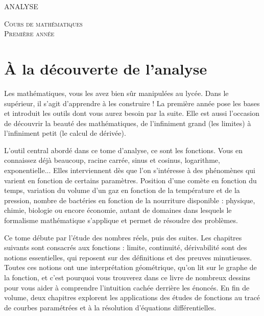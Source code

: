 
\pagestyle{empty}\thispagestyle{empty}
\vspace*{\fill}
\begin{center}
\fontsize{52}{52}\selectfont
\textsc{ANALYSE}
\end{center}
\vfill
\begin{center}
\huge
\textsc{Cours de mathématiques}\\ 
\textsc{Première année}
\end{center}

\begin{center}
\end{center}
\clearemptydoublepage
\thispagestyle{empty}

\vspace*{\fill}
\section*{À la découverte de l'analyse}
 
 
Les mathématiques, vous les avez bien sûr manipulées au lycée. Dans le supérieur, il s'agit d'apprendre à les construire ! La première année pose les bases et introduit les outils dont vous aurez besoin par la suite. Elle est aussi l'occasion de découvrir la beauté des mathématiques, de l'infiniment grand (les limites) à l'infiniment petit (le calcul de dérivée).


L'outil central abordé dans ce tome d'analyse, ce sont les fonctions. Vous en connaissez déjà beaucoup, racine carrée, sinus et cosinus, logarithme, exponentielle... Elles interviennent dès que l'on s'intéresse à des phénomènes qui varient en fonction de certains paramètres. Position d'une comète en fonction du temps, variation du volume d'un gaz en fonction de la température et de la pression, nombre de bactéries en fonction de la nourriture disponible : physique, chimie, biologie ou encore économie, autant de domaines dans lesquels le formalisme mathématique s'applique et permet de résoudre des problèmes.

\medskip

Ce tome débute par l'étude des nombres réels, puis des suites. Les chapitres suivants sont consacrés aux fonctions : limite, continuité, dérivabilité sont des notions essentielles, qui reposent sur des définitions et des preuves minutieuses. Toutes ces notions ont une interprétation géométrique, qu'on lit sur le graphe de la fonction, et c'est pourquoi vous trouverez dans ce livre de nombreux dessins pour vous aider à comprendre l'intuition cachée derrière les énoncés. En fin de volume, deux chapitres explorent les applications des études de fonctions au tracé de courbes paramétrées et à la résolution d'équations différentielles.

